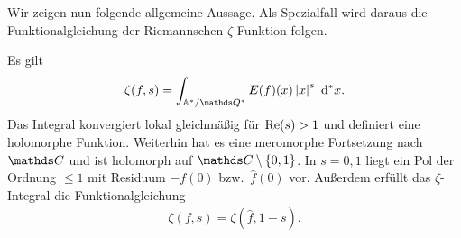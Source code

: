 Wir zeigen nun folgende allgemeine Aussage.
Als Spezialfall wird daraus die Funktionalgleichung der Riemannschen $\zeta$-Funktion folgen.
\begin{thm}
Es gilt
\begin{align*}
	\zeta(f,s)=\int_{\A^\ast/\Q^\ast} E(f)(x)\abs{x}^s~\mathrm{d}^\ast x.	
\end{align*}
Das Integral konvergiert lokal gleichmäßig für $\operatorname{Re}(s)>1$ und definiert eine holomorphe Funktion.
Weiterhin hat es eine meromorphe Fortsetzung nach $\C$ und ist holomorph auf $\C\setminus\{0,1\}$.
In $s=0,1$ liegt ein Pol der Ordnung $\leq 1$ mit Residuum $-f(0)$ bzw.\, $\hat{f}(0)$ vor.
Außerdem erfüllt das $\zeta$-Integral die Funktionalgleichung
\begin{align*}
	\zeta(f,s)=\zeta(\hat{f},1-s).
\end{align*}
\end{thm}
